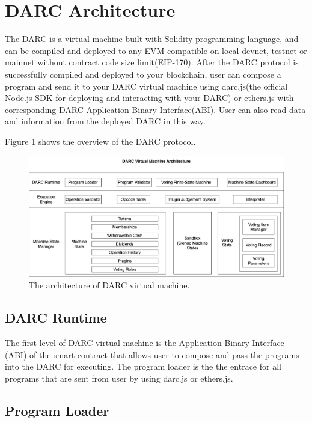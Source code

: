 \documentclass[main.tex]{subfiles}
\begin{document}
\section{DARC Architecture}


The DARC is a virtual machine built with Solidity programming language, and can be compiled and deployed to any EVM-compatible on local devnet, testnet or mainnet without contract code size limit(EIP-170). After the DARC protocol is successfully compiled and deployed to your blockchain, user can compose a program and send it to your DARC virtual machine using darc.js(the official Node.js SDK for deploying and interacting with your DARC) or ethers.js with corresponding DARC Application Binary Interface(ABI). User can also read data and information from the deployed DARC in this way.

Figure 1 shows the overview of the DARC protocol. 

\begin{figure}
\centering
\includegraphics[width=1\linewidth]{architecture.png}
\caption{\label{fig:architecture}The architecture of DARC virtual machine.}
\end{figure}

\subsection{DARC Runtime}

The first level of DARC virtual machine is the Application Binary Interface (ABI) of the smart contract that allows user to compose and pass the programs into the DARC for executing. The program loader is the the entrace for all programs that are sent from user by using darc.js or ethers.js. 

\subsection{Program Loader}
\end{document}
